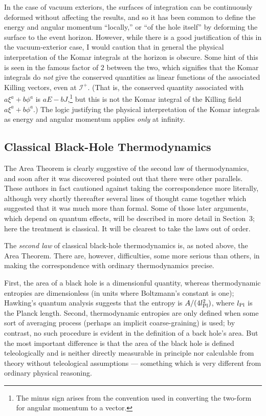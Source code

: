 \documentclass[12pt]{article}
\newcommand{\scrif}{{{\mathscr I}^{+}}}
\begin{document}
In the case of vacuum exteriors, the surfaces of integration can be continuously deformed without affecting the results, and so it has been common to define the energy and angular momentum ``locally,'' or ``of the hole itself'' by deforming the surface to the event horizon.  However, while there is a good justification of this in the vacuum-exterior case, I would caution 
that in general the physical  interpretation of the Komar integrals at the horizon is obscure.
Some hint of this is seen in the famous factor of $2$ between the two, which signifies that the 
Komar integrals do {\em not} give the
conserved quantities as linear functions of the associated Killing vectors, even at $\scrif$.  
(That is, the conserved quantity associated with $a\xi ^a +b\phi ^a$ is $aE-bJ$,\footnote{The minus sign arises from the convention used in converting the two-form for angular momentum to a vector.} but this is not the Komar integral of the Killing field $a\xi ^a+b\phi ^a$.)  The logic justifying the physical interpretation of the Komar integrals as energy and angular momentum applies {\em only} at infinity.

\subsection{Classical Black-Hole Thermodynamics}

The Area Theorem is clearly suggestive of the second law of thermodynamics, and soon after it was discovered \citet{Bardeen:1973gs} pointed out that there were other parallels.  
These authors in fact cautioned against taking the correspondence more literally, although very shortly thereafter several lines of thought came together which suggested that it was much more than formal.  Some of those later arguments, which depend on quantum effects, will be described in more detail in Section~3; here the treatment is classical.  It will be clearest to take the laws out of order.

The {\em second law} of classical black-hole thermodynamics is, as noted above, the Area Theorem.  There are, however, difficulties, some more serious than others, in making the correspondence with ordinary thermodynamics precise.  

First, the area of a black hole is a dimensionful quantity, whereas thermodynamic entropies are dimensionless (in units where Boltzmann's constant is one); Hawking's quantum analysis suggests that the entropy is $A/(4l_{\rm Pl}^2)$, where $l_{\rm Pl}$ is the Planck length.
Second, thermodynamic entropies are only defined when some sort of averaging process (perhaps an implicit 
coarse-graining) is used; by contrast, no such procedure is evident in the definition of a back hole's area.  
But the most important difference is that the area of the black hole is defined teleologically and is neither directly measurable in principle nor calculable from theory without teleological assumptions --- something which is very different from ordinary physical reasoning.
\end{document}
